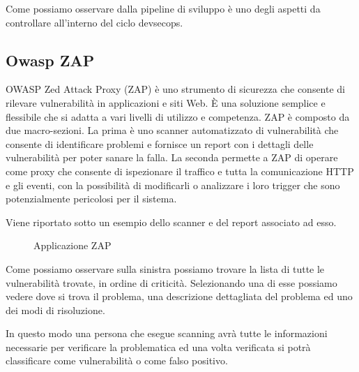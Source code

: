 Come possiamo osservare dalla pipeline di sviluppo è uno degli aspetti da controllare all’interno del ciclo devsecops.
\subsection{Owasp ZAP} 
\cite{OWASP_ZAP}
OWASP Zed Attack Proxy (ZAP) è uno strumento di sicurezza che consente di rilevare vulnerabilità in applicazioni e siti Web. È una soluzione semplice e flessibile che si adatta a vari livelli di utilizzo e competenza. ZAP è composto da due macro-sezioni. La prima è uno scanner automatizzato di vulnerabilità che consente di identificare problemi e fornisce un report con i dettagli delle vulnerabilità per poter sanare la falla. La seconda permette a ZAP di operare come proxy che consente di ispezionare il traffico e tutta la comunicazione HTTP e gli eventi, con la possibilità di modificarli o analizzare i loro trigger che sono potenzialmente pericolosi per il sistema.

Viene riportato sotto un esempio dello scanner e del report associato ad esso.
\begin{figure}[H]
    \caption{Applicazione ZAP}
    \label{fig:zap}
\end{figure}
Come possiamo osservare sulla sinistra possiamo trovare la lista di tutte le vulnerabilità trovate, in ordine di criticità. Selezionando una di esse possiamo vedere dove si trova il problema, una descrizione dettagliata del problema ed uno dei modi di risoluzione. 

In questo modo una persona che esegue scanning avrà tutte le informazioni necessarie per verificare la problematica ed una volta verificata si potrà classificare come vulnerabilità o come falso positivo. 

